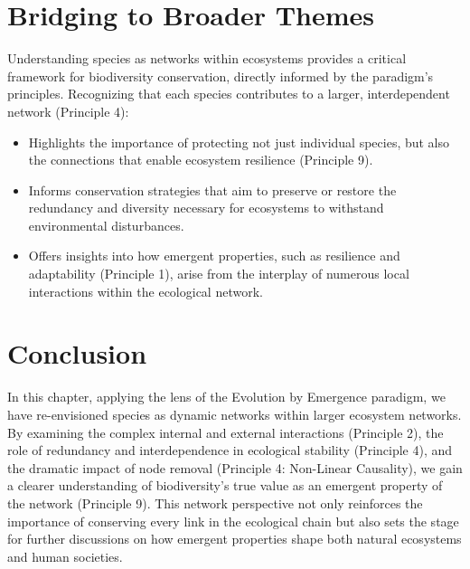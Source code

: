 \section{Bridging to Broader Themes}
Understanding species as networks within ecosystems provides a critical framework for biodiversity conservation, directly informed by the paradigm's principles. Recognizing that each species contributes to a larger, interdependent network (Principle 4):
\begin{itemize}
    \item Highlights the importance of protecting not just individual species, but also the connections that enable ecosystem resilience (Principle 9).
    \item Informs conservation strategies that aim to preserve or restore the redundancy and diversity necessary for ecosystems to withstand environmental disturbances.
    \item Offers insights into how emergent properties, such as resilience and adaptability (Principle 1), arise from the interplay of numerous local interactions within the ecological network.
\end{itemize} %

\section*{Conclusion}
In this chapter, applying the lens of the Evolution by Emergence paradigm, we have re-envisioned species as dynamic networks within larger ecosystem networks. By examining the complex internal and external interactions (Principle 2), the role of redundancy and interdependence in ecological stability (Principle 4), and the dramatic impact of node removal (Principle 4: Non-Linear Causality), we gain a clearer understanding of biodiversity's true value as an emergent property of the network (Principle 9). This network perspective not only reinforces the importance of conserving every link in the ecological chain but also sets the stage for further discussions on how emergent properties shape both natural ecosystems and human societies. %
\cleardoublepage